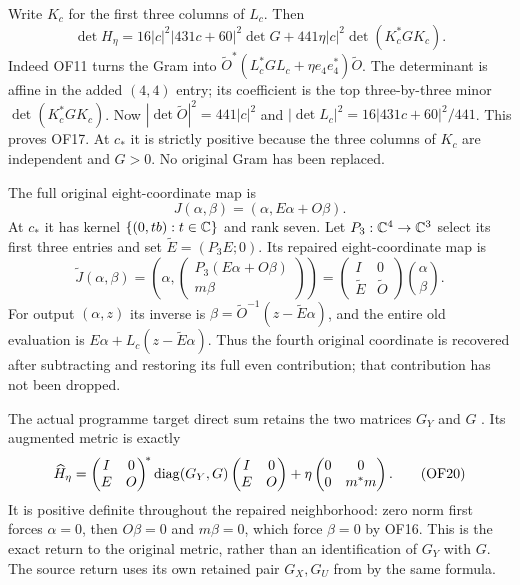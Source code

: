\documentclass[11pt]{article}
\begin{document}
Write $K_c$ for the first three columns of $L_c$. Then
\begin{equation}
 \det H_\eta=16|c|^2|431c+60|^2\det G
       +441\eta|c|^2\det(K_c^*GK_c).\tag{OF17}
\end{equation}
Indeed OF11 turns the Gram into
$\widetilde O^*(L_c^*GL_c+\eta e_4e_4^*)\widetilde O$.
The determinant is affine in the added $(4,4)$ entry; its
coefficient is the top three-by-three minor $\det(K_c^*GK_c)$.
Now $|\det\widetilde O|^2=441|c|^2$ and
$|\det L_c|^2=16|431c+60|^2/441$. This proves OF17.
At $c_*$ it is strictly positive because the three columns of $K_c$
are independent and $G>0$. No original Gram has been replaced.

The full original eight-coordinate map is
\begin{equation}
 J(\alpha,\beta)=(\alpha,E\alpha+O\beta).
 \tag{OF18}
\end{equation}
At $c_*$ it has kernel $\{(0,tb):t\in\mathbb C\}$ and rank seven.
Let $P_3:\mathbb C^4\to\mathbb C^3$ select its first three entries and set
$\widetilde E=(P_3E;0)$. Its repaired eight-coordinate map is
\begin{equation}
 \widetilde J(\alpha,\beta)
 =\left(\alpha,\begin{pmatrix}P_3(E\alpha+O\beta)\\m\beta\end{pmatrix}\right)
 =\begin{pmatrix}I&0\\\widetilde E&\widetilde O\end{pmatrix}
   \binom\alpha\beta.\tag{OF19}
\end{equation}
For output $(\alpha,z)$ its inverse is
$\beta=\widetilde O^{-1}(z-\widetilde E\alpha)$, and the entire
old evaluation is $E\alpha+L_c(z-\widetilde E\alpha)$.
Thus the fourth original coordinate is recovered after subtracting
and restoring its full even contribution; that contribution has
not been dropped.

The actual programme target direct sum retains the two matrices
$G_Y$ and $G$ \cite[RW14]{sfrepair:Fable}. Its augmented metric is exactly
\begin{equation}
 \widehat H_\eta=
 \begin{pmatrix}I&0\\E&O\end{pmatrix}^{\!*}
 \operatorname{diag}(G_Y,G)
 \begin{pmatrix}I&0\\E&O\end{pmatrix}
 +\eta\begin{pmatrix}0&0\\0&m^*m\end{pmatrix}.
 \tag{OF20}
\end{equation}
It is positive definite throughout the repaired neighborhood:
zero norm first forces $\alpha=0$, then $O\beta=0$ and
$m\beta=0$, which force $\beta=0$ by OF16. This is the exact
return to the original metric, rather than an identification of
$G_Y$ with $G$. The source return uses its own retained pair
$G_X,G_U$ from \cite[RW19]{sfrepair:Fable} by the same formula.
\end{document}
